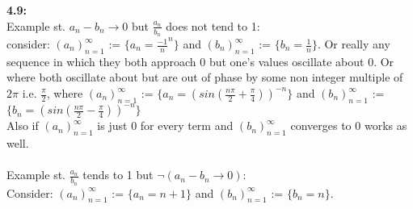 \documentclass[11pt]{article}
\begin{document}
    \\\\
    \textbf{4.9:}\\
    Example st. $a_n - b_n \rightarrow 0$ but $\frac{a_n}{b_n}$ does not tend to 1:\\
    consider: $(a_n)^\infty_{n=1}$ := $\{a_n = \frac{-1}{n}^n\}$ and $(b_n)^\infty_{n=1}$ := $\{b_n = \frac{1}{n}\}$.
    Or really any sequence in which they both approach 0 but one's values oscillate about 0.
    Or where both oscillate about but are out of phase by some non integer multiple of $2\pi$
    i.e. $\frac{\pi}{2}$, where $(a_n)^\infty_{n=1}$ := $\{a_n = (sin(\frac{n\pi}{2} + \frac{\pi}{4}))^{-n}\}$
    and $(b_n)^\infty_{n=1}$ := $\{b_n = (sin(\frac{n\pi}{2} - \frac{\pi}{4}))^{-n}\}$\\
    Also if $(a_n)^\infty_{n=1}$ is just 0 for every term and $(b_n)^\infty_{n=1}$ converges to 0 works as well.\\
    \\
    Example st. $\frac{a_n}{b_n}$ tends to 1 but $\neg(a_n - b_n \rightarrow 0)$:\\
    Consider: $(a_n)^\infty_{n=1}$ := $\{a_n = n+1\}$ and $(b_n)^\infty_{n=1}$ := $\{b_n = n\}$.
    \\\\
\end{document}
